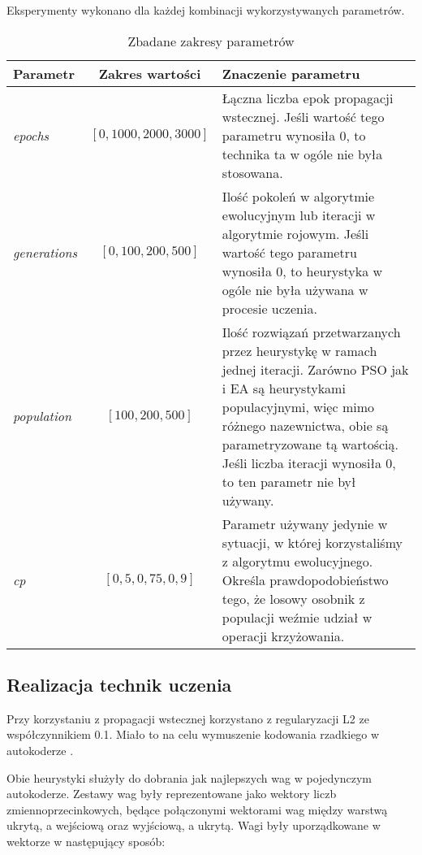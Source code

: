 \documentclass[11pt,a4paper,oneside]{report}
\begin{document}
Eksperymenty wykonano dla każdej kombinacji wykorzystywanych parametrów.

\begin{table}[H]
	\caption{Zbadane zakresy parametrów \label{table:params}}
	\begin{tabularx}{\linewidth}{|l|c|X|}
		\hline
		\textbf{Parametr} & \textbf{Zakres wartości} & \textbf{Znaczenie parametru}\\
		\hline \hline
		\textit{epochs} & $[0, 1000, 2000, 3000]$ & Łączna liczba epok propagacji wstecznej\footnotemark[1]. Jeśli wartość tego parametru wynosiła 0, to technika ta w ogóle nie była stosowana. \\
		\hline
		\textit{generations} & $[0, 100, 200, 500]$ & Ilość pokoleń w algorytmie ewolucyjnym lub iteracji w algorytmie rojowym. Jeśli wartość tego parametru wynosiła 0, to heurystyka w ogóle nie była używana w procesie uczenia. \\
		\hline
		\textit{population} & $[100, 200, 500]$ &  Ilość rozwiązań przetwarzanych przez heurystykę w ramach jednej iteracji. Zarówno PSO jak i EA są heurystykami populacyjnymi, więc mimo różnego nazewnictwa, obie są parametryzowane tą wartością. Jeśli liczba iteracji wynosiła 0, to ten parametr nie był używany. \\
		\hline
		\textit{cp} & $[0,5, 0,75, 0,9]$	& Parametr używany jedynie w sytuacji, w której korzystaliśmy z algorytmu ewolucyjnego. Określa prawdopodobieństwo tego, że losowy osobnik z populacji weźmie udział w operacji krzyżowania. \\
		\hline
	\end{tabularx}
\end{table}


\subsection{Realizacja technik uczenia}

Przy korzystaniu z propagacji wstecznej korzystano z regularyzacji L2 \cite{girosi1995regularization} ze współczynnikiem 0.1. Miało to na celu wymuszenie kodowania rzadkiego w autokoderze \cite{ngiam2011optimization}.

Obie heurystyki służyły do dobrania jak najlepszych wag w pojedynczym autokoderze. Zestawy wag były reprezentowane jako wektory liczb zmiennoprzecinkowych, będące połączonymi wektorami wag między warstwą ukrytą, a wejściową oraz wyjściową, a ukrytą. Wagi były uporządkowane w wektorze w następujący sposób:
\end{document}
